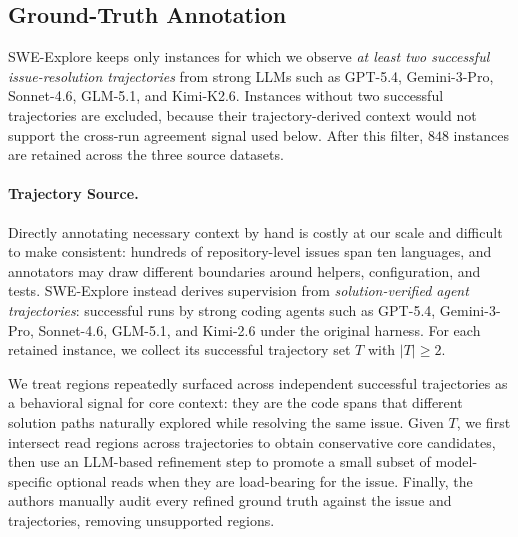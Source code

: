 \documentclass{llmxive}
\begin{document}
\subsection{Ground-Truth Annotation}
\label{sec:gt}


SWE-Explore keeps only instances for which we observe \emph{at least two successful issue-resolution trajectories} from strong LLMs such as GPT-5.4, Gemini-3-Pro, Sonnet-4.6, GLM-5.1, and Kimi-K2.6. Instances without two successful trajectories are excluded, because their trajectory-derived context would not support the cross-run agreement signal used below. After this filter, $848$ instances are retained across the three source datasets.

\paragraph{Trajectory Source.}
Directly annotating necessary context by hand is costly at our scale and difficult to make consistent: hundreds of repository-level issues span ten languages, and annotators may draw different boundaries around helpers, configuration, and tests. SWE-Explore instead derives supervision from \emph{solution-verified agent trajectories}: successful runs by strong coding agents such as GPT-5.4, Gemini-3-Pro, Sonnet-4.6, GLM-5.1, and Kimi-2.6 under the original harness. For each retained instance, we collect its successful trajectory set $T$ with $|T| \geq 2$.



We treat regions repeatedly surfaced across independent successful trajectories as a behavioral signal for core context: they are the code spans that different solution paths naturally explored while resolving the same issue. Given $T$, we first intersect read regions across trajectories to obtain conservative core candidates, then use an LLM-based refinement step to promote a small subset of model-specific optional reads when they are load-bearing for the issue. Finally, the authors manually audit every refined ground truth against the issue and trajectories, removing unsupported regions.
\end{document}
